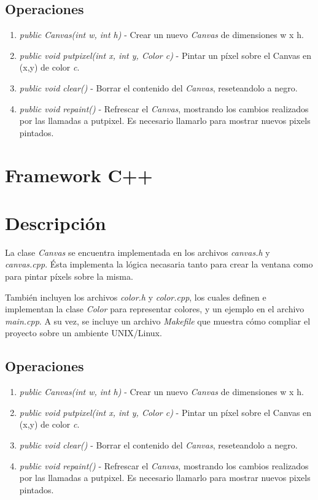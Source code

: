 \documentclass[11pt]{amsart}
\begin{document}
\subsection{Operaciones}
\begin{enumerate}
	\item \emph{public Canvas(int w, int h)} - Crear un nuevo \emph{Canvas} de dimensiones w x h.
	\item \emph{public void putpixel(int x, int y, Color c)} - Pintar un p\'ixel sobre el Canvas en (x,y) de color \emph{c}.
	\item \emph{public void clear()} - Borrar el contenido del \emph{Canvas}, reseteandolo a negro.
	\item \emph{public void repaint()} - Refrescar el \emph{Canvas}, mostrando los cambios realizados por las llamadas a putpixel. Es necesario llamarlo para mostrar nuevos pixels pintados.
\end{enumerate}

\section{Framework C++}

\section{Descripci\'on}
La clase \emph{Canvas} se encuentra implementada en los archivos \emph{canvas.h} y \emph{canvas.cpp}. \'Esta implementa la l\'ogica necasaria tanto para crear la ventana como para pintar p\'ixels sobre la misma.

Tambi\'en incluyen los archivos \emph{color.h} y \emph{color.cpp}, los cuales definen e implementan la clase \emph{Color} para representar colores, y un ejemplo en el archivo \emph{main.cpp}. A su vez, se incluye un archivo \emph{Makefile} que muestra c\'omo compliar el proyecto sobre un ambiente UNIX/Linux.

\subsection{Operaciones}
\begin{enumerate}
	\item \emph{public Canvas(int w, int h)} - Crear un nuevo \emph{Canvas} de dimensiones w x h.
	\item \emph{public void putpixel(int x, int y, Color c)} - Pintar un p\'ixel sobre el Canvas en (x,y) de color \emph{c}.
	\item \emph{public void clear()} - Borrar el contenido del \emph{Canvas}, reseteandolo a negro.
	\item \emph{public void repaint()} - Refrescar el \emph{Canvas}, mostrando los cambios realizados por las llamadas a putpixel. Es necesario llamarlo para mostrar nuevos pixels pintados.
\end{enumerate}
\end{document}
